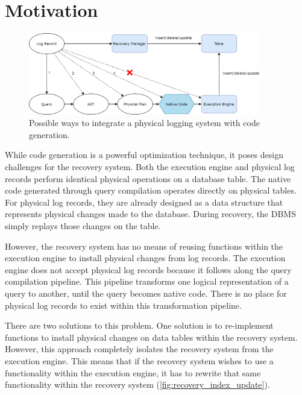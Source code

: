 \documentclass[12pt]{cmuthesis}
\begin{document}
\section{Motivation}
\begin{figure}[t!]
\centering
\includegraphics[width=0.9\textwidth]{images/Motivation.png}
\caption{Possible ways to integrate a physical logging system with code generation.}
\label{fig:motivation}
\end{figure}
While code generation is a powerful optimization technique, it poses design challenges for the recovery system. Both the execution engine and physical log records perform identical physical operations on a database table. The native code generated through query compilation operates directly on physical tables. For physical log records, they are already designed as a data structure that represents physical changes made to the database. During recovery, the DBMS simply replays those changes on the table.

However, the recovery system has no means of reusing functions within the execution engine to install physical changes from log records. The execution engine does not accept physical log records because it follows along the query compilation pipeline. This pipeline transforms one logical representation of a query to another, until the query becomes native code. There is no place for physical log records to exist within this transformation pipeline.

There are two solutions to this problem. One solution is to re-implement functions to install physical changes on data tables within the recovery system. However, this approach completely isolates the recovery system from the execution engine. This means that if the recovery system wishes to use a functionality within the execution engine, it has to rewrite that same functionality within the recovery system (\cref{fig:recovery_index_update}).
\end{document}

